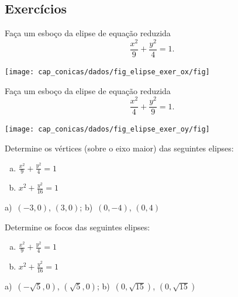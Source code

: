 \subsection*{Exercícios}

\begin{exer}
  Faça um esboço da elipse de equação reduzida
  \begin{equation}
    \frac{x^2}{9} + \frac{y^2}{4} = 1.
  \end{equation}
\end{exer}
\begin{resp}
  \texttt{[image: cap\_conicas/dados/fig\_elipse\_exer\_ox/fig]}
\end{resp}

\begin{exer}
  Faça um esboço da elipse de equação reduzida
  \begin{equation}
    \frac{x^2}{4} + \frac{y^2}{9} = 1.
  \end{equation}
\end{exer}
\begin{resp}
  \texttt{[image: cap\_conicas/dados/fig\_elipse\_exer\_oy/fig]}
\end{resp}

\begin{exer}
  Determine os vértices (sobre o eixo maior) das seguintes elipses:
  \begin{enumerate}[a)]
  \item $\displaystyle \frac{x^2}{9} + \frac{y^2}{4} = 1$
  \item $\displaystyle x^2 + \frac{y^2}{16} = 1$
  \end{enumerate}
\end{exer}
\begin{resp}
  a)~$(-3, 0)$, $(3, 0)$; b)~$(0, -4)$, $(0, 4)$
\end{resp}

\begin{exer}
  Determine os focos das seguintes elipses:
  \begin{enumerate}[a)]
  \item $\displaystyle \frac{x^2}{9} + \frac{y^2}{4} = 1$
  \item $\displaystyle x^2 + \frac{y^2}{16} = 1$
  \end{enumerate}
\end{exer}
\begin{resp}
  a)~$(-\sqrt{5}, 0)$, $(\sqrt{5}, 0)$; b)~$(0, \sqrt{15})$, $(0, \sqrt{15})$
\end{resp}

